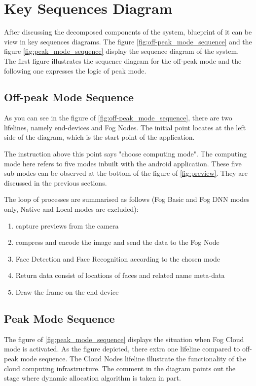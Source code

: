 \section{Key Sequences Diagram}
After discussing the decomposed components of the system, blueprint of it can be view in key sequences diagrams.
The figure \ref{fig:off-peak_mode_sequence} and the figure \ref{fig:peak_mode_sequence} display the sequence diagram of the system. The first figure illustrates the sequence diagram for the off-peak mode and the following one expresses the logic of peak mode.

\subsection{Off-peak Mode Sequence}
As you can see in the figure of \ref{fig:off-peak_mode_sequence}, there are two lifelines, namely end-devices and Fog Nodes. The initial point locates at the left side of the diagram, which is the start point of the application.

The instruction above this point says "choose computing mode". The computing mode here refers to five modes inbuilt with the android application. These five sub-modes can be observed at the bottom of the figure of \ref{fig:preview}. They are discussed in the previous sections.

The loop of processes are summarised as follows (Fog Basic and Fog DNN modes only, Native and Local modes are excluded):
\begin{enumerate}
    \item capture previews from the camera
    \item compress and encode the image and send the data to the Fog Node
    \item Face Detection and Face Recognition according to the chosen mode
    \item Return data consist of locations of faces and related name meta-data
    \item Draw the frame on the end device
\end{enumerate}

\subsection{Peak Mode Sequence}
The figure of \ref{fig:peak_mode_sequence} displays the situation when Fog Cloud mode is activated. As the figure depicted, there extra one lifeline compared to off-peak mode sequence. The Cloud Nodes lifeline illustrate the functionality of the cloud computing infrastructure. The comment in the diagram points out the stage where dynamic allocation algorithm is taken in part.

